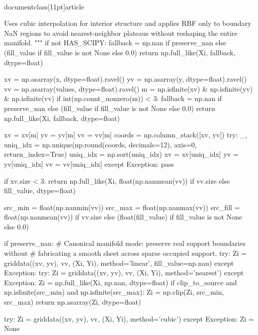 \\documentclass[11pt]{article}
\begin{document}
\begin{CodeBlock}
    Uses cubic interpolation for interior structure and applies RBF only to
    boundary NaN regions to avoid nearest-neighbor plateaus without reshaping
    the entire manifold.
    """
    if not HAS_SCIPY:
        fallback = np.nan if preserve_nan else (fill_value if fill_value is not None else 0.0)
        return np.full_like(Xi, fallback, dtype=float)

    xv = np.asarray(x, dtype=float).ravel()
    yv = np.asarray(y, dtype=float).ravel()
    vv = np.asarray(values, dtype=float).ravel()
    m = np.isfinite(xv) & np.isfinite(yv) & np.isfinite(vv)
    if int(np.count_nonzero(m)) < 3:
        fallback = np.nan if preserve_nan else (fill_value if fill_value is not None else 0.0)
        return np.full_like(Xi, fallback, dtype=float)

    xv = xv[m]
    yv = yv[m]
    vv = vv[m]
    coords = np.column_stack([xv, yv])
    try:
        _, uniq_idx = np.unique(np.round(coords, decimals=12), axis=0, return_index=True)
        uniq_idx = np.sort(uniq_idx)
        xv = xv[uniq_idx]
        yv = yv[uniq_idx]
        vv = vv[uniq_idx]
    except Exception:
        pass

    if xv.size < 3:
        return np.full_like(Xi, float(np.nanmean(vv)) if vv.size else fill_value, dtype=float)

    src_min = float(np.nanmin(vv))
    src_max = float(np.nanmax(vv))
    src_fill = float(np.nanmean(vv)) if vv.size else (float(fill_value) if fill_value is not None else 0.0)

    if preserve_nan:
        # Canonical manifold mode: preserve real support boundaries without
        # fabricating a smooth sheet across sparse occupied support.
        try:
            Zi = griddata((xv, yv), vv, (Xi, Yi), method='linear', fill_value=np.nan)
        except Exception:
            try:
                Zi = griddata((xv, yv), vv, (Xi, Yi), method='nearest')
            except Exception:
                Zi = np.full_like(Xi, np.nan, dtype=float)
        if clip_to_source and np.isfinite(src_min) and np.isfinite(src_max):
            Zi = np.clip(Zi, src_min, src_max)
        return np.asarray(Zi, dtype=float)

    try:
        Zi = griddata((xv, yv), vv, (Xi, Yi), method='cubic')
    except Exception:
        Zi = None


\end{CodeBlock}
\end{document}
